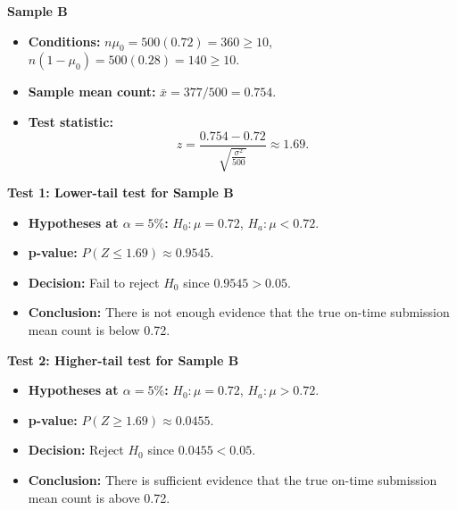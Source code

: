 
\textbf{Sample B}

\begin{itemize}
	\item \textbf{Conditions:} \(n\mu_0=500(0.72)=360\ge10\), \(n(1-\mu_0)=500(0.28)=140\ge10\).
	\item \textbf{Sample mean count:} \(\bar x=377/500=0.754\).
	\item \textbf{Test statistic:}
	\[
	z=\frac{0.754-0.72}{\sqrt{\frac{\sigma^2}{500}}}\approx 1.69.
	\]
\end{itemize}

\textbf{Test 1: Lower-tail test for Sample B}

\begin{itemize}
	\item \textbf{Hypotheses at \(\alpha=5\%\):} \(H_0\colon \mu=0.72\), \(H_a\colon \mu<0.72\).
	\item \textbf{p-value:} \(P(Z\le 1.69)\approx 0.9545\).
	\item \textbf{Decision:} Fail to reject \(H_0\) since \(0.9545>0.05\).
	\item \textbf{Conclusion:} There is not enough evidence that the true on-time submission mean count is below 0.72.
\end{itemize}

\begin{center}
\end{center}


\textbf{Test 2: Higher-tail test for Sample B}

\begin{itemize}
	\item \textbf{Hypotheses at \(\alpha=5\%\):} \(H_0\colon \mu=0.72\), \(H_a\colon \mu>0.72\).
	\item \textbf{p-value:} \(P(Z\ge 1.69)\approx 0.0455\).
	\item \textbf{Decision:} Reject \(H_0\) since \(0.0455<0.05\).
	\item \textbf{Conclusion:} There is sufficient evidence that the true on-time submission mean count is above 0.72.
\end{itemize}

\begin{center}
\end{center}

